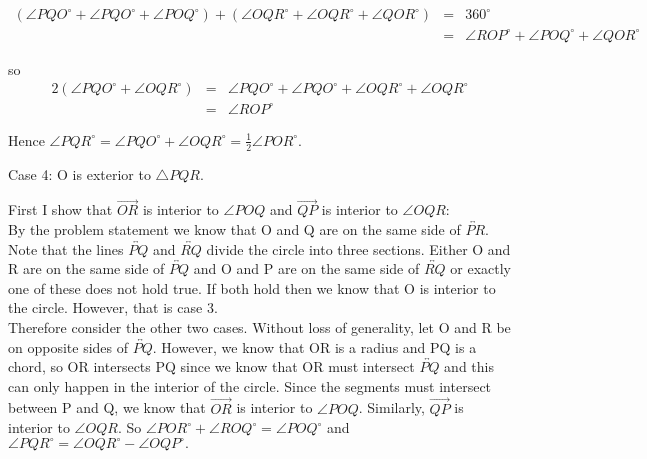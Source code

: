 \documentclass[12pt,letterpaper]{article}
\begin{document}
\begin{eqnarray*}
(\angle PQO^\circ+\angle PQO^\circ+\angle POQ^\circ) +(\angle OQR^\circ+\angle OQR^\circ+\angle QOR^\circ)&=& 360^\circ\\
&=& \angle ROP^\circ + \angle POQ^\circ + \angle QOR^\circ
\end{eqnarray*}

 so \begin{eqnarray*}
 2(\angle PQO^\circ+\angle OQR^\circ)&=& \angle PQO^\circ+\angle PQO^\circ +\angle OQR^\circ+\angle OQR^\circ  \\&=& \angle ROP^\circ 
 \end{eqnarray*}

 
 

Hence $\angle PQR^\circ = \angle PQO^\circ+\angle OQR^\circ  = \frac{1}{2} \angle POR^\circ$.\\





\newpage 

Case 4: O is exterior to $\triangle PQR$.


First I show that $\overrightarrow{OR}$ is interior to $\angle POQ$ and $\overrightarrow{QP}$ is interior to $\angle OQR$:\\


By the problem statement we know that O and Q are on the same side of $\overleftrightarrow{PR}$.\\

Note that the lines $\overleftrightarrow{PQ}$ and $\overleftrightarrow{RQ}$ divide the circle into three sections. Either O and R are on the same side of $\overleftrightarrow{PQ}$ and O and P are on the same side of $\overleftrightarrow{RQ}$ or exactly one of these does not hold true.  If both hold then we know that O is interior to the circle.  However, that is case 3.  \\

Therefore consider the other two cases.  Without loss of generality, let O and R be on opposite sides of $\overleftrightarrow{PQ}$.  However, we know that OR is a radius and PQ is a chord, so OR intersects PQ since we know that OR must intersect $\overleftrightarrow{PQ}$ and this can only happen in the interior of the circle.  Since the segments must intersect between P and Q, we know that $\overrightarrow{OR}$ is interior to $\angle POQ$.  Similarly, $\overrightarrow{QP}$ is interior to $\angle OQR$.  So $\angle POR^\circ + \angle ROQ^\circ = \angle POQ^\circ$ and $\angle PQR^\circ = \angle OQR^\circ - \angle OQP^\circ.$\\
\end{document}
